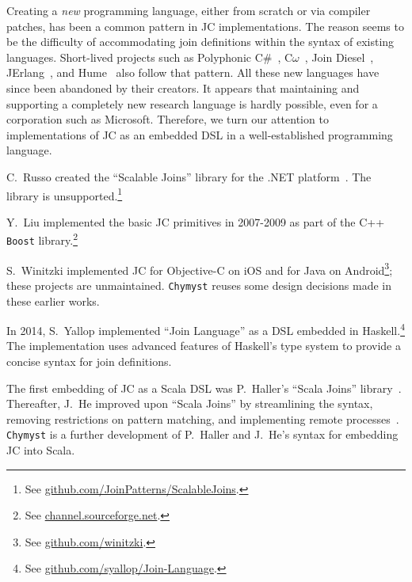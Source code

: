 \documentclass[sigplan,10pt,review,anonymous]{acmart}\settopmatter{printfolios=true}
\begin{document}
Creating a \emph{new} programming language, either from scratch or
via compiler patches, has been a common pattern in JC implementations.
The reason seems to be the difficulty of accommodating join definitions
within the syntax of existing languages. Short-lived projects such
as Polyphonic C\#~\citep{BenFou2002}, C$\omega$~\citep{Rus2007},
Join Diesel~\citep{Ose2005}, JErlang~\citep{PloEis2009}, and Hume~\citep{HamEA2006}
also follow that pattern. All these new languages have since been
abandoned by their creators. It appears that maintaining and supporting
a completely new research language is hardly possible, even for a
corporation such as Microsoft. Therefore, we turn our attention to
implementations of JC as an embedded DSL in a well-established programming
language. 

C.~Russo created the ``Scalable Joins'' library for the .NET platform~\citep{Rus2007}.
The library is unsupported.\footnote{ See \href{https://github.com/JoinPatterns/ScalableJoins}{github.com/JoinPatterns/ScalableJoins}.}

\begin{comment}
(This is not actually JC but CSP!) In 2009, F.~Peschanski published
a JC library for the Lua language, called ``LuaPi''. The library
appears to be unsupported.\footnote{ See \href{https://github.com/fredokun/LuaPi}{github.com/fredokun/LuaPi}.}
\end{comment}

Y.~Liu implemented the basic JC primitives in 2007-2009 as part of
the C++ \texttt{Boost} library.\footnote{ See \href{http://channel.sourceforge.net/}{channel.sourceforge.net}.} 

S.~Winitzki implemented JC for
Objective-C on iOS and for Java on Android\footnote{ See \href{https://github.com/winitzki}{github.com/winitzki}.};
these projects are unmaintained. \texttt{Chymyst}
reuses some design decisions made in these earlier works.

In 2014, S.~Yallop implemented ``Join Language'' as a DSL embedded
in Haskell.\footnote{ See \href{https://github.com/syallop/Join-Language}{github.com/syallop/Join-Language}.}
The implementation uses advanced features of Haskell's type system
to provide a concise syntax for join definitions.

The first embedding of JC as a Scala DSL was P.~Haller's ``Scala
Joins'' library~\citep{HalCut2008}. Thereafter, J.~He improved
upon ``Scala Joins'' by streamlining the syntax, removing restrictions
on pattern matching, and implementing remote processes~\citep{He2014}.
\texttt{Chymyst} is a further development of P.~Haller and J.~He's
syntax for embedding JC into Scala.
\end{document}
